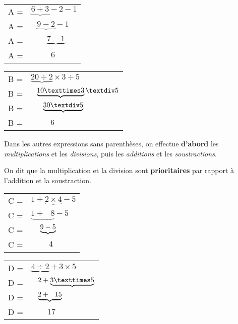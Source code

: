 \documentclass[../€Cours-complet/Cours-complet]{subfiles}
\begin{document}
\begin{exemple}
	\begin{minipage}{0.5\textwidth}
		\begin{tabular}{ll}
			A = & $\underbrace{6 + 3} - 2 - 1 $          \\
			A = & $\phantom{6\ }\underbrace{9 - 2} - 1 $ \\
			A = & $\phantom{6 +\ }\underbrace{7 - 1}$    \\
			A = & $\phantom{6 + 3\ }6$
		\end{tabular}
	\end{minipage}
	\begin{minipage}{0.5\textwidth}
		\begin{tabular}{ll}
			B = & $\underbrace{20 ÷ 2} × 3 ÷ 5 $           \\
			B = & $\hspace{0.8em}\underbrace{10 × 3} ÷ 5 $ \\
			B = & $\hspace{1.7em}\underbrace{30 ÷ 5}$      \\
			B = & $\hspace{2.8em}6$
		\end{tabular}
	\end{minipage}
\end{exemple}

\begin{cours}
	Dans les autres expressions sans parenthèses, on effectue \textbf{d'abord} les \textit{multiplications} et les \textit{divisions}, puis les \textit{additions} et les \textit{soustractions}.

	On dit que la multiplication et la division sont \textbf{prioritaires} par rapport à l'addition et la soustraction.
\end{cours}

\begin{exemple}
	\begin{minipage}{0.5\textwidth}
		\begin{tabular}{ll}
			C = & $1 + \underbrace{2 × 4} - 5$           \\
			C = & $\underbrace{1 + \phantom{2\ }8} - 5 $ \\
			C = & $\hspace{1.3em}\underbrace{9 - 5}$     \\
			C = & $\phantom{1 + 8}4$
		\end{tabular}
	\end{minipage}
	\begin{minipage}{0.5\textwidth}
		\begin{tabular}{ll}
			D = & $\underbrace{4 ÷ 2} + 3 × 5$                      \\
			D = & $\hspace{0.9em}2 + \underbrace{3 × 5}$            \\
			D = & $\hspace{0.9em}\underbrace{2 + \hspace{0.7em}15}$ \\
			D = & $\hspace{2em}17$
		\end{tabular}
	\end{minipage}
\end{exemple}
\end{document}

